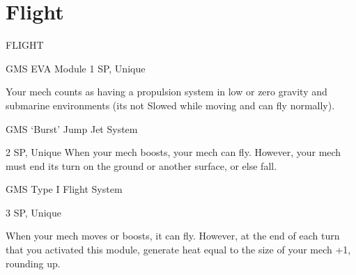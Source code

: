 \section{Flight}

                                                   FLIGHT

GMS EVA Module
1 SP, Unique

Your mech counts as having a propulsion system in low or zero gravity and submarine
environments (its not Slowed while moving and can fly normally).


GMS ‘Burst’ Jump Jet System

2 SP, Unique
When your mech boosts, your mech can fly. However, your mech must end its turn on the
ground or another surface, or else fall.


GMS Type I Flight System

3 SP, Unique

When your mech moves or boosts, it can fly. However, at the end of each turn that you activated
this module, generate heat equal to the size of your mech +1, rounding up.

